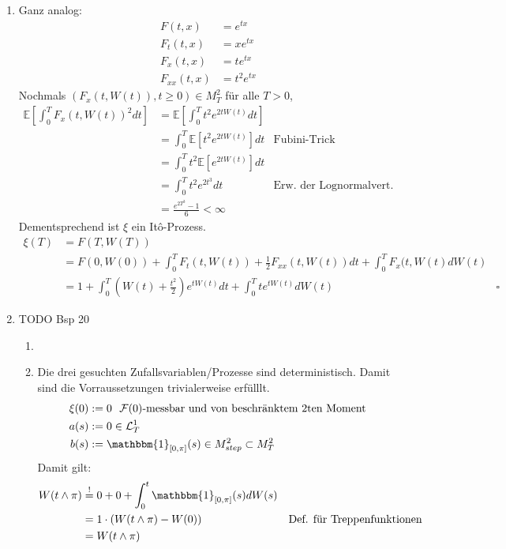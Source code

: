 \documentclass[a4paper,11pt,notitlepage,fullpage]{article}
\newcommand{\Ee}[1]{\mathbb E\left[#1\right]}
\newcommand{\indd}[1]{\mathbbm{1}_{#1}}
\begin{document}
\begin{enumerate}
\item Ganz analog:
\begin{align*}
F(t, x) &= e^{tx} \\
F_t(t, x) &= x e^{tx} \\
F_x(t, x) &= t e^{tx} \\
F_{xx}(t, x) &= t^2 e^{tx}
\end{align*}
Nochmals $(F_x(t, W(t)), t \geq 0) \in M_T^2$ für alle $T > 0$, 
\begin{align*}
\Ee{ \int_0^T F_x(t, W(t))^2 dt} &= \Ee{ \int_0^T t^2 e^{2tW(t)} dt} \\
&= \int_0^T \Ee{ t^2 e^{2tW(t)}} dt &\text{Fubini-Trick} \\
&= \int_0^T  t^2 \Ee{ e^{2tW(t)}} dt \\
&= \int_0^T  t^2 e^{2t^3} dt &\text{Erw. der Lognormalvert.}\\
&= \frac{e^{2T^3} - 1}{6} < \infty
\end{align*}
Dementsprechend ist $\xi$ ein Itô-Prozess.
\begin{align*}
\xi(T) &= F(T, W(T)) \\
&= F(0, W(0)) + \int_0^T F_t(t, W(t)) + \frac{1}{2} F_{xx}(t, W(t)) dt + \int_0^T F_x(t, W(t) dW(t) \\
&= 1 + \int_0^T (W(t) + \frac{t^2}{2}) e^{tW(t)} dt + \int_0^T t e^{tW(t)} dW(t)&\square
\end{align*}

\item TODO Bsp 20
\begin{enumerate}
\item

\item Die drei gesuchten Zufallsvariablen/Prozesse sind deterministisch. Damit sind die Vorraussetzungen trivialerweise erfülllt.
\begin{align*}
\xi(0) &:= 0 ~~\mathcal F(0)\text{-messbar und von beschränktem 2ten Moment} \\
a(s) &:= 0 \in \mathcal L_T^1 \\
b(s) &:= \indd{[0, \pi]}(s) \in M_{step}^2 \subset M_T^2
\end{align*}
Damit gilt:
\begin{align*}
W(t \wedge \pi) &\stackrel{!}{=} 0 + 0 + \int_0^t \indd{[0, \pi]}(s) dW(s) \\
&= 1 \cdot (W(t \wedge \pi) - W(0)) &\text{Def. für Treppenfunktionen} \\
&= W(t \wedge \pi)
\end{align*}
\end{enumerate}

\end{enumerate}
\end{document}
